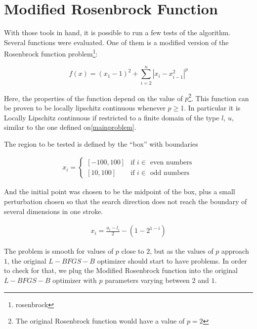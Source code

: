 \section{Modified Rosenbrock Function}

With those tools in hand, it is possible to run a few tests of the algorithm. Several functions were evaluated. One of them is a modified version of the Rosenbrock function problem\footnote{rosenbrock}:

\begin{equation} \label{modifiedrosenbrock}
    f(x) = (x_1 - 1)^2 + \sum_{i = 2}^n |x_i - x_{i - 1}^2|^p
\end{equation}

Here, the properties of the function depend on the value of $p$\footnote{The original Rosenbrock function would have a value of $p = 2$}. This function can be proven to be locally lipschitz continuous whenever $p \geq 1$. In particular it is Locally Lipschitz continuous if restricted to a finite domain of the type $l$, $u$, similar to the one defined on\ref{mainproblem}.

The region to be tested is defined by the ``box'' with boundaries

\begin{equation}
  \begin{aligned}
    x_i = 
    \begin{cases}
      [-100, 100] & \text{if } i \in \text{ even numbers} \\
      [10, 100] & \text{if } i \in \text{ odd numbers}
    \end{cases}
  \end{aligned}
\end{equation}

And the initial point was chosen to be the midpoint of the box, plus a small perturbation chosen so that the search direction does not reach the boundary of several dimensions in one stroke.

\begin{equation}
  \begin{aligned}
    x_i = \frac{u_i - l_i}{2} - (1 - 2^{1 - i})
  \end{aligned}
\end{equation}

The problem is smooth for values of $p$ close to $2$, but as the values of $p$ approach $1$, the original $L-BFGS-B$ optimizer should start to have problems. In order to check for that, we plug the Modified Rosenbrock function into the original $L-BFGS-B$ optimizer with $p$ parameters varying between $2$ and $1$. 


